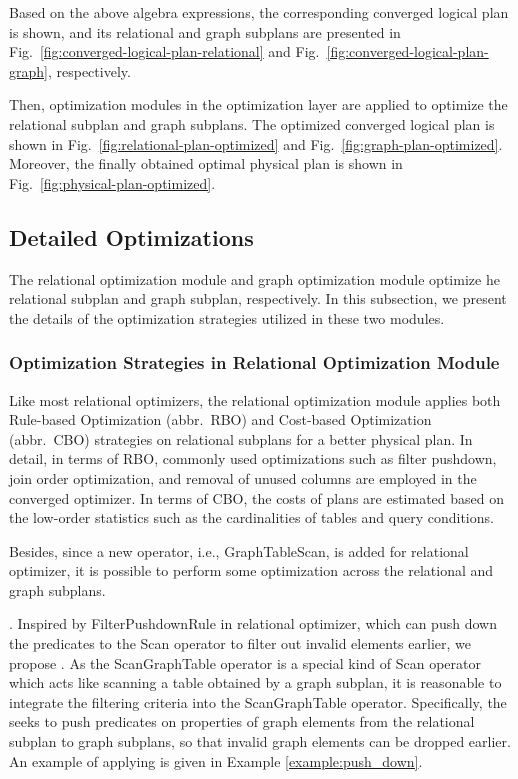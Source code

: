 \begin{example}
    Based on the above algebra expressions, the corresponding converged logical plan is shown, and its relational and graph subplans are presented in Fig.~\ref{fig:converged-logical-plan-relational} and Fig.~\ref{fig:converged-logical-plan-graph}, respectively.
    
    Then, optimization modules in the optimization layer are applied to optimize the relational subplan and graph subplans.
    The optimized converged logical plan is shown in Fig.~\ref{fig:relational-plan-optimized} and Fig.~\ref{fig:graph-plan-optimized}.
    Moreover, the finally obtained optimal physical plan is shown in Fig.~\ref{fig:physical-plan-optimized}.
\end{example}

\subsection{Detailed Optimizations}
\label{sec:framework:detailed-optimizations}

The relational optimization module and graph optimization module optimize he relational subplan and graph subplan, respectively.
In this subsection, we present the details of the optimization strategies utilized in these two modules. 

\subsubsection{Optimization Strategies in Relational Optimization Module}

Like most relational optimizers, the relational optimization module applies both Rule-based Optimization (abbr.~RBO) and Cost-based Optimization (abbr.~CBO) strategies on relational subplans for a better physical plan.
In detail, in terms of RBO, commonly used optimizations such as filter pushdown, join order optimization, and removal of unused columns are employed in the converged optimizer.
In terms of CBO, the costs of plans are estimated based on the low-order statistics such as the cardinalities of tables and query conditions.

Besides, since a new operator, i.e., GraphTableScan, is added for relational optimizer, it is possible to perform some optimization across the relational and graph subplans.

\filterrule. 
Inspired by FilterPushdownRule in relational optimizer, which can push down the predicates to the Scan operator to filter out invalid elements earlier, we propose \filterrule.
As the ScanGraphTable operator is a special kind of Scan operator which acts like scanning a table obtained by a graph subplan, it is reasonable to integrate the filtering criteria into the ScanGraphTable operator.
Specifically, the \filterrule seeks to push predicates on properties of graph elements from the relational subplan to graph subplans, so that invalid graph elements can be dropped earlier.
An example of applying \filterrule is given in Example \ref{example:push_down}.

